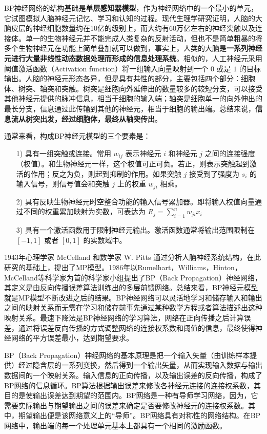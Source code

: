 \documentclass[UTF8]{ctexart}
\begin{document}
BP神经网络的结构基础是\textbf{单层感知器模型}，作为神经网络中的一个最小的单元，它试图模拟人脑神经元记忆、学习和认知的过程。现代生理学研究证明，人脑的大脑皮层的神经细胞数量约在10亿的级别上，而大约有60万亿左右的神经突触以及连接体。单一的生物神经元并不能完成人类复杂的反射活动，但也不是简单粗暴的将多个生物神经元在功能上简单叠加就可以做到，事实上，人类的大脑是\textbf{一系列神经元进行大量非线性动态数据处理而形成的信息处理系统}。相似的，人工神经元采用阈值激活函数（Activation function）将一组输入向量映射到一个 $0$ 或是 $1$ 的目标输出。人脑的神经元形态各异，但是具有共性的部分，主要包括四个部分：细胞体、树突、轴突和突触。树突是细胞向外延伸出的数量较多的较短分支，可以接受其他神经元提供的脉冲信息，相当于细胞的输入端；轴突是细胞单一的向外伸出的最长分支，信息通过此传输到其他的神经元，相当于细胞的输出端。总结来说，\textbf{信息流从树突出发，经过细胞体，最终从轴突传出}。 \par

通常来看，构成BP神经元模型的三个要素是：

\begin{itemize}
\item [1)]
具有一组突触或连接。常用 $w_{ij}$ 表示神经元 $i$ 和神经元 $j$ 之间的连接强度（权值）。和生物神经元一样，这个权值可正可负。若正，则表示突触起到激活的作用；反之为负，则起到抑制的作用。如果突触 $j$ 接受到了强度为 $s_i$ 的输入信号，则信号值会和突触 $j$ 上的权重 $w_{ji}$ 相乘。
\item [2)]
具有反映生物神经元时空整合功能的输入信号累加器。即将输入权值向量通过不同的权重累加映射为实数，可表达为 $R_j = \sum_{i=1}^{n}w_{ji}x_{i}$
\item [3)]
具有一个激活函数用于限制神经元输出。激活函数通常将输出范围限制在 $[-1,1]$ 或者 $[0,1]$ 的实数域中。
\end{itemize}

1943年心理学家 McCelland 和数学家 W. Pitts 通过分析人脑神经系统结构，在此研究的基础上，提出了MP模型。1986年以Rumelhart，Williams，Hinton，McCelland等科学家为首的科学家小组提出了BP（Back Propagation）神经网络，其定义是由反向传播误差算法训练出的多层前馈网络。总结来看，BP神经元模型就是MP模型不断改进之后的结果。BP神经网络可以灵活地学习和储存输入和输出之间的映射关系而无需在学习和储存前事先通过某种数学方程或者算法描述出这种映射关系。最速下降法是BP神经网络的学习算法，网络在正向传播之后计算误差，通过将误差反向传播的方式调整网络的连接权系数和阈值的信息，最终使得神经网络的平方误差最小，达到期望要求。 \par

BP（Back Propagation）神经网络的基本原理是把一个输入矢量（由训练样本提供）经过隐含层的一系列变换，然后得到一个输出矢量，从而实现输入数据与输出数据间的一个映射关系。输入信息的正向传播，以及输出误差的反向传播，构成了BP网络的信息循环。BP算法根据输出误差来修改各神经元连接的连接权系数，其目的是使输出误差达到期望的范围内。BP网络是一种有导师学习网络，因为，它需要实际输出与期望输出之间的误差来确定是否要修改神经元的连接权系数。其中，期望输出便是该网络意义上的“导师”。BP网络具有对称性的网络结构。在BP网络中，输出端的每一个处理单元基本上都具有一个相同的激励函数。
\end{document}
